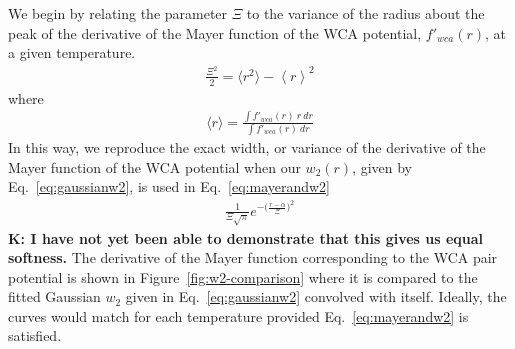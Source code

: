 \documentclass[letterpaper,twocolumn,amsmath,amssymb,prb]{revtex4-1}
\newcommand\kirstiesays[1]{{\bf \color{red}K: #1}}
\begin{document}
We begin by relating the parameter $\Xi$ to the variance of the radius 
about the peak of the derivative of the Mayer function 
of the WCA potential, $f'_{wca}(r)$,
at a given temperature.
\begin{align}
    \frac{\Xi^2}{2}= \langle r^2\rangle-\left<r\right>^2
\end{align}
where
\begin{align}
    \langle r\rangle = \frac{\int f'_{wca}(r)~r~dr}{\int f'_{wca}(r)~dr}
\end{align}
In this way, we reproduce the exact width, or variance of the derivative 
of the Mayer function of the WCA potential when our $w_2(r)$, given by 
Eq.~\ref{eq:gaussianw2}, is used in     
Eq.~\ref{eq:mayerandw2} 
\begin{align}
   \frac{1}{\Xi\sqrt{\pi}}e^{-\big(\frac{r-\alpha}{\Xi}\big)^2}
\end{align}
\kirstiesays{I have not yet been able to demonstrate that this gives us equal softness.}
The derivative of the Mayer function corresponding to the WCA pair potential 
is shown in Figure~\ref{fig:w2-comparison} where it is compared to the 
fitted Gaussian $w_2$ given in Eq.~\ref{eq:gaussianw2} convolved with itself. 
Ideally, the curves would match for each temperature provided 
Eq.~\ref{eq:mayerandw2} is satisfied.
\end{document}
